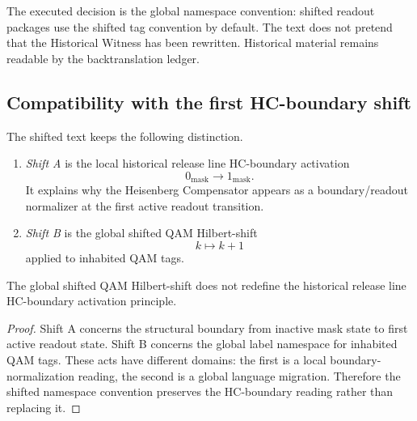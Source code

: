 \begin{remark}
\label{rem:v400-r01-what-is-executed}
The executed decision is the global namespace convention: shifted readout packages
use the shifted tag convention by default. The text does not pretend that the
Historical Witness has been rewritten. Historical material remains readable by
the backtranslation ledger.
\end{remark}

\subsection{Compatibility with the first HC-boundary shift}
\label{subsec:v400-r01-compatibility-first-hc-boundary-shift}

\begin{definition}
\label{def:v400-r01-shift-a-shift-b-shifted-text}
The shifted text keeps the following distinction.
\begin{enumerate}[leftmargin=*]
 \item \emph{Shift A} is the local historical release line HC-boundary activation
 \[
 0_{\mathrm{mask}}\longrightarrow 1_{\mathrm{mask}}.
 \]
 It explains why the Heisenberg Compensator appears as a boundary/readout
 normalizer at the first active readout transition.

 \item \emph{Shift B} is the global shifted QAM Hilbert-shift
 \[
 k\longmapsto k+1
 \]
 applied to inhabited QAM tags.
\end{enumerate}
\end{definition}

\begin{proposition}
\label{prop:v400-r01-hc-boundary-shift-not-redefined}
The global shifted QAM Hilbert-shift does not redefine the historical release line HC-boundary
activation principle.
\end{proposition}

\begin{proof}
Shift A concerns the structural boundary from inactive mask state to first
active readout state. Shift B concerns the global label namespace for
inhabited QAM tags. These acts have different domains: the first is a local
boundary-normalization reading, the second is a global language migration.
Therefore the shifted namespace convention preserves the HC-boundary reading rather
than replacing it.
\end{proof}

